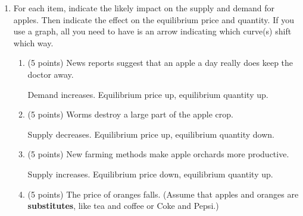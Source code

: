 \documentclass{article}
\newcommand{\mybigskip}{\vspace{1in}}
\begin{document}
\begin{enumerate}









\item \begin{EXAM} For each item, indicate the likely impact on the supply and demand for apples. Then indicate the effect on the equilibrium price and quantity. If you use a graph, all you need to have is an arrow indicating which curve(s) shift which way. \end{EXAM}

    \begin{enumerate}

    \item \begin{EXAM} (5 points) News reports suggest that an apple a day really does keep the doctor away. \mybigskip \end{EXAM}

\begin{KEY} Demand increases. Equilibrium price up, equilibrium quantity up.\end{KEY}


    \item \begin{EXAM} (5 points) Worms destroy a large part of the apple crop. \mybigskip \end{EXAM}

\begin{KEY} Supply decreases. Equilibrium price up, equilibrium quantity down.\end{KEY}


    \item \begin{EXAM} (5 points) New farming methods make apple orchards more productive. \mybigskip \end{EXAM}

\begin{KEY} Supply increases. Equilibrium price down, equilibrium quantity up.\end{KEY}


    \item \begin{EXAM} (5 points) The price of oranges falls. (Assume that apples and oranges are \textbf{substitutes}, like tea and coffee or Coke and Pepsi.) \mybigskip \end{EXAM}


\end{enumerate}
\end{enumerate}
\end{document}

